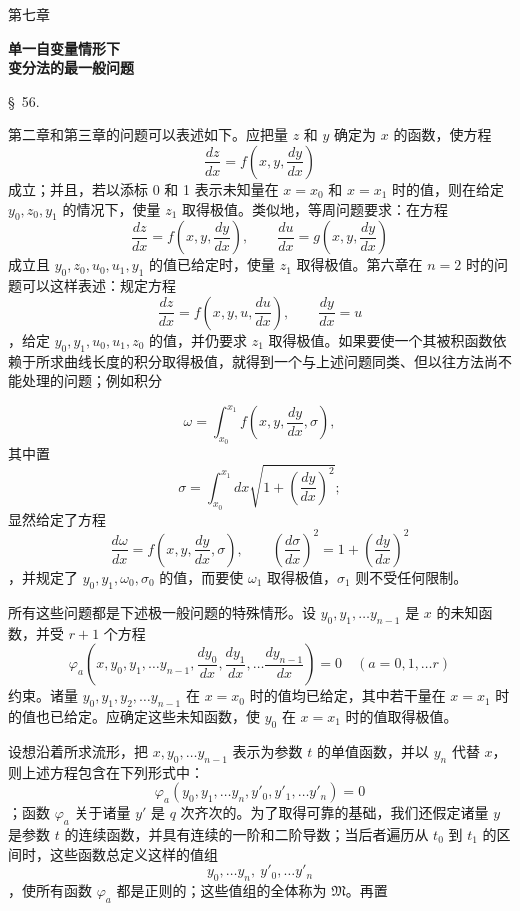 \documentclass[11pt,a4paper,leqno]{article}
\begin{document}
\begin{center}
{\Large 第七章}

\vspace{1em}
{\Large\bfseries 单一自变量情形下\\
变分法的最一般问题}

\vspace{1em}
{\large \S~56.}
\end{center}

第二章和第三章的问题可以表述如下。应把量 $z$ 和 $y$ 确定为 $x$ 的函数，使方程
\[
\frac{dz}{dx}=f\left(x,y,\frac{dy}{dx}\right)
\]
成立；并且，若以添标 0 和 1 表示未知量在 $x=x_0$ 和 $x=x_1$ 时的值，则在给定 $y_0,z_0,y_1$ 的情况下，使量 $z_1$ 取得极值。类似地，等周问题要求：在方程
\[
\frac{dz}{dx}=f\left(x,y,\frac{dy}{dx}\right),\qquad
\frac{du}{dx}=g\left(x,y,\frac{dy}{dx}\right)
\]
成立且 $y_0,z_0,u_0,u_1,y_1$ 的值已给定时，使量 $z_1$ 取得极值。第六章在 $n=2$ 时的问题可以这样表述：规定方程
\[
\frac{dz}{dx}=f\left(x,y,u,\frac{du}{dx}\right),\qquad
\frac{dy}{dx}=u
\]
，给定 $y_0,y_1,u_0,u_1,z_0$ 的值，并仍要求 $z_1$ 取得极值。如果要使一个其被积函数依赖于所求曲线长度的积分取得极值，就得到一个与上述问题同类、但以往方法尚不能处理的问题；例如积分

\[
\omega=\int_{x_0}^{x_1}f\left(x,y,\frac{dy}{dx},\sigma\right),
\]
其中置
\[
\sigma=\int_{x_0}^{x_1}dx\sqrt{1+\left(\frac{dy}{dx}\right)^2};
\]
显然给定了方程
\[
\frac{d\omega}{dx}=f\left(x,y,\frac{dy}{dx},\sigma\right),\qquad
\left(\frac{d\sigma}{dx}\right)^2=1+\left(\frac{dy}{dx}\right)^2
\]
，并规定了 $y_0,y_1,\omega_0,\sigma_0$ 的值，而要使 $\omega_1$ 取得极值，$\sigma_1$ 则不受任何限制。

所有这些问题都是下述极一般问题的特殊情形。设 $y_0,y_1,\ldots y_{n-1}$ 是 $x$ 的未知函数，并受 $r+1$ 个方程
\[
\varphi_a\left(x,y_0,y_1,\ldots y_{n-1},
\frac{dy_0}{dx},\frac{dy_1}{dx},\ldots\frac{dy_{n-1}}{dx}\right)=0
\quad(a=0,1,\ldots r)
\]
约束。诸量 $y_0,y_1,y_2,\ldots y_{n-1}$ 在 $x=x_0$ 时的值均已给定，其中若干量在 $x=x_1$ 时的值也已给定。应确定这些未知函数，使 $y_0$ 在 $x=x_1$ 时的值取得极值。

设想沿着所求流形，把 $x,y_0,\ldots y_{n-1}$ 表示为参数 $t$ 的单值函数，并以 $y_n$ 代替 $x$，则上述方程包含在下列形式中：
\begin{equation}\tag{1}
\varphi_a(y_0,y_1,\ldots y_n,y'_0,y'_1,\ldots y'_n)=0
\end{equation}
；函数 $\varphi_a$ 关于诸量 $y'$ 是 $q$ 次齐次的。为了取得可靠的基础，我们还假定诸量 $y$ 是参数 $t$ 的连续函数，并具有连续的一阶和二阶导数；当后者遍历从 $t_0$ 到 $t_1$ 的区间时，这些函数总定义这样的值组
\begin{equation}\tag{2}
y_0,\ldots y_n,\ y'_0,\ldots y'_n
\end{equation}
，使所有函数 $\varphi_a$ 都是正则的；这些值组的全体称为 $\mathfrak M$。再置
\end{document}
